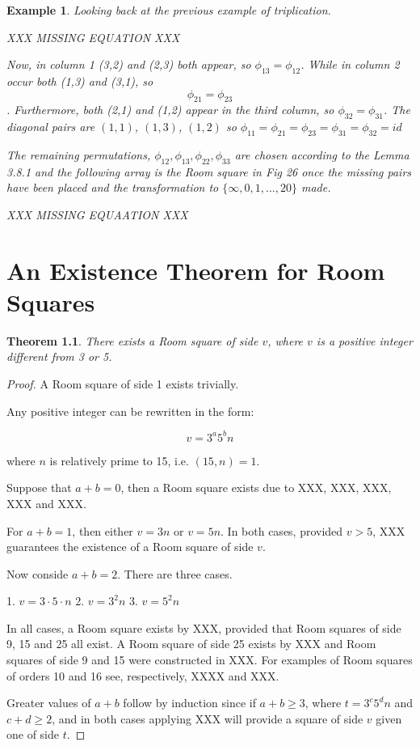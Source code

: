 \documentclass[
  11pt,
  a4paper]{book}
\newtheorem{theorem}{Theorem}
\newtheorem{example}{Example}
\begin{document}
\begin{example}
Looking back at the previous example of triplication.

XXX MISSING EQUATION XXX

Now, in column 1 (3,2) and (2,3) both appear, so
$\phi _{13} = \phi _{12}$.
While in column 2 occur both (1,3) and
(3,1), so $$\phi _{21} = \phi _{23}$$.
Furthermore, both (2,1) and (1,2) appear in the third
column, so $\phi _{32} = \phi _{31}$.
The diagonal pairs are $(1, 1)$, $(1, 3)$, $(1, 2)$ so
$\phi _{11} = \phi _{21} = \phi _{23} = \phi _{31} = \phi _{32} = id$

The remaining permutations,
$\phi _{12}, \phi _{13}, \phi _{22}, \phi _{33}$ are chosen
according to the Lemma 3.8.1
and the following array is the Room square in Fig 26 once
the missing pairs have been placed and the transformation to
$\{\infty, 0, 1, ..., 20\}$ made.

XXX MISSING EQUAATION XXX
\end{example}

\hypertarget{an-existence-theorem-for-room-squares}{%
\chapter{An Existence Theorem for Room Squares}\label{an-existence-theorem-for-room-squares}}

\begin{theorem}
There exists a Room square of side $v$, where $v$
is a positive integer different from 3 or 5.
\end{theorem}

\begin{proof}
A Room square of side 1 exists trivially.

Any positive integer can be rewritten in the form:

\begin{equation}
v = 3^{a}5^{b}n
\end{equation}

where $n$ is relatively prime to 15, i.e.
$(15, n) = 1$.

Suppose that $a + b = 0$, then a Room square exists
due to XXX, XXX, XXX, XXX and XXX.

For $a + b = 1$, then either $v = 3n$ or $v = 5n$.
In both cases, provided $v > 5$, XXX guarantees the
existence of a Room square of side $v$.

Now conside $a + b = 2$. There are three cases.

1. $v = 3\cdot 5\cdot n$
2. $v = 3^{2}n$
3. $v = 5^{2}n$

In all cases, a Room square exists by XXX, provided
that Room squares of side 9, 15 and 25 all exist. A
Room square of side 25 exists by XXX and Room squares
of side 9 and 15 were constructed in XXX. For examples
of Room squares of orders 10 and 16 see, respectively,
XXXX and XXX.

Greater values of $a + b$ follow by induction since if
$a + b \geq 3$, where $t = 3^{c}5^{d}n$ and
$c + d \geq 2$, and in both cases applying XXX will
provide a square of side $v$ given one of side $t$.
\end{proof}
\end{document}
